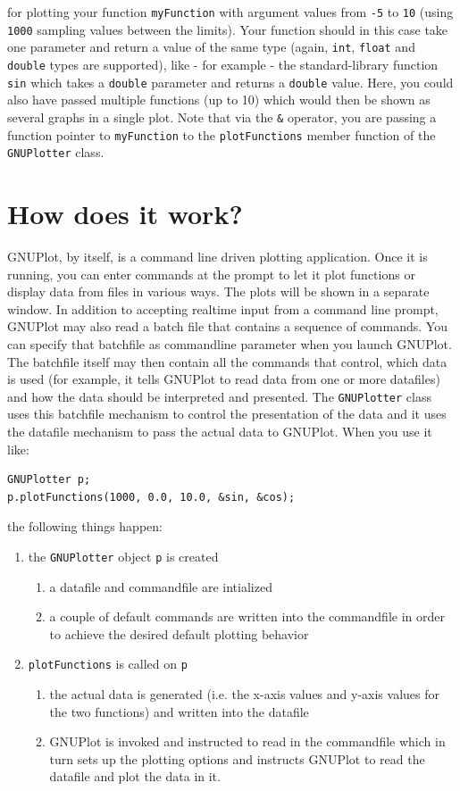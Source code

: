 \documentclass[11pt]{article}
\begin{document}
for plotting your function \texttt{myFunction} with argument values from \texttt{-5} to \texttt{10} (using \texttt{1000} sampling values between the limits). Your function should in this case take one parameter and return a value of the same type (again, \texttt{int}, \texttt{float} and \texttt{double} types are supported), like - for example - the standard-library function \texttt{sin} which takes a \texttt{double} parameter and returns a \texttt{double} value. Here, you could also have passed multiple functions (up to 10) which would then be shown as several graphs in a single plot. Note that via the \texttt{\&} operator, you are  passing a function pointer to \texttt{myFunction} to the \texttt{plotFunctions} member function of the \texttt{GNUPlotter} class.

\section{How does it work?}
GNUPlot, by itself, is a command line driven plotting application. Once it is running, you can enter commands at the prompt to let it plot functions or display data from files in various ways. The plots will be shown in a separate window. In addition to accepting realtime input from a command line prompt, GNUPlot may also read a batch file that contains a sequence of commands. You can specify that batchfile as commandline parameter when you launch GNUPlot. The batchfile itself may then contain all the commands that control, which data is used (for example, it tells GNUPlot to read data from one or more datafiles) and how the data should be interpreted and presented. The \texttt{GNUPlotter} class uses this batchfile mechanism to control the presentation of the data and it uses the datafile mechanism to pass the actual data to GNUPlot. When you use it like:
\begin{verbatim}
GNUPlotter p;
p.plotFunctions(1000, 0.0, 10.0, &sin, &cos);
\end{verbatim}
the following things happen:
\begin{enumerate}
	\item the \texttt{GNUPlotter} object \texttt{p} is created
	\begin{enumerate}
		\item a datafile and commandfile are intialized
		\item a couple of default commands are written into the commandfile in order to achieve the desired default plotting behavior
	\end{enumerate}
	\item	\texttt{plotFunctions} is called on \texttt{p}
	
	\begin{enumerate}
		\item the actual data is generated (i.e. the x-axis values and y-axis values for the two functions) and written into the datafile
		\item GNUPlot is invoked and instructed to read in the commandfile which in turn sets up the plotting options and instructs GNUPlot to read the datafile and plot the data in it.
	\end{enumerate}
\end{enumerate}
\end{document}
